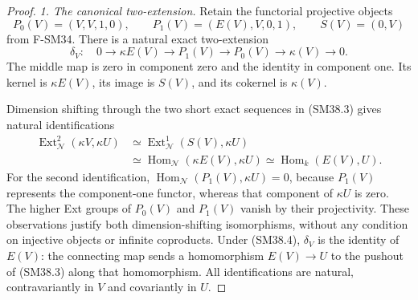 \begin{proof}
\emph{1. The canonical two-extension.}
Retain the functorial projective objects
\[
 P_0(V)=(V,V,1,0),\qquad P_1(V)=(E(V),V,0,1),
 \qquad S(V)=(0,V)
\]
from F-SM34.  There is a natural exact two-extension
\[
 \delta_V:\quad
 0\longrightarrow\kappa E(V)\longrightarrow P_1(V)
   \longrightarrow P_0(V)\longrightarrow\kappa(V)
   \longrightarrow0.                                      \tag{SM38.3}
\]
The middle map is zero in component zero and the identity
in component one.  Its kernel is \(\kappa E(V)\), its image
is \(S(V)\), and its cokernel is \(\kappa(V)\).

Dimension shifting through the two short exact sequences in
(SM38.3) gives natural identifications
\[
 \begin{aligned}
 \operatorname{Ext}^2_{\mathcal N}(\kappa V,\kappa U)
  &\simeq\operatorname{Ext}^1_{\mathcal N}(S(V),\kappa U)\\
  &\simeq\operatorname{Hom}_{\mathcal N}(\kappa E(V),\kappa U)
   \simeq\operatorname{Hom}_k(E(V),U).
 \end{aligned}                                               \tag{SM38.4}
\]
For the second identification,
\(\operatorname{Hom}_{\mathcal N}(P_1(V),\kappa U)=0\),
because \(P_1(V)\) represents the component-one functor,
whereas that component of \(\kappa U\) is zero.
The higher Ext groups of \(P_0(V)\) and \(P_1(V)\) vanish
by their projectivity.  These observations justify both
dimension-shifting isomorphisms, without any condition on
injective objects or infinite coproducts.  Under (SM38.4),
\(\delta_V\) is the identity of \(E(V)\): the connecting
map sends a homomorphism \(E(V)\to U\) to the pushout of
(SM38.3) along that homomorphism.  All identifications are
natural, contravariantly in \(V\) and covariantly in \(U\).


\end{proof}
